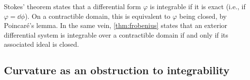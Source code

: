 Stokes’ theorem states that a differential form $φ$ is integrable if it is exact (i.e., if $φ = \dd ϕ$).
On a contractible domain, this is equivalent to $φ$ being closed, by Poincaré's lemma.
In the same vein, \cref{thm:frobenius} states that an exterior differential system is integrable over a contractible domain if and only if its associated ideal is closed.


\subsection{Curvature as an obstruction to integrability}
